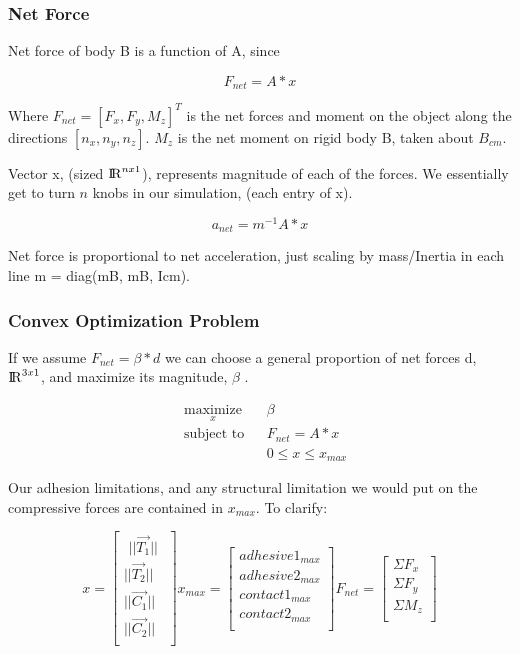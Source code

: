 \documentclass{beamer}
\begin{document}
\frame
{
\frametitle{ Net Force }


Net force of body B is a function of A, since 

\begin{equation}
	F_{net} = A * x
\end{equation}


Where $F_{net} = [F_{x}, F_{y},  M_{z}]^{T}$ is the net forces and moment on the object along the directions $[n_{x}, n_{y}, n_{z}]$.  $M_z$ is the net moment on rigid body B, taken about $B_{cm}$.

Vector x, (sized ${\rm I\!R} ^{n x 1}$), represents magnitude of each of the forces. We essentially get to turn $n$ knobs in our simulation, (each entry of x). 

\begin{equation}
	a_{net} = m^{-1}A * x
\end{equation}

Net force is proportional to net acceleration, just scaling by mass/Inertia in each line m = diag(mB, mB, Icm). 
	
}


\frame
{
\frametitle{ Convex Optimization Problem }

If we assume $ F_{net} = \beta*d $ we can choose a general proportion of net forces d, ${\rm I\!R} ^{3 x 1}$,  and maximize its magnitude, $\beta$ .
	
\begin{equation*}
	\begin{aligned}
	& \underset{x}{\text{maximize}}
	& & \beta \\
	& \text{subject to}
	& & F_{net} = A * x \\
	&
	& & 0 \leq x \leq x_{max}
	\end{aligned}
\end{equation*}

Our adhesion limitations, and any structural limitation we would put on the compressive forces are contained in $x_{max}$. To clarify:  

\begin{equation*}
x = 
\begin{bmatrix}
           \,\, ||\vec{T_{1}}|| \,\,\\
           ||\vec{T_{2}}|| \\
           ||\vec{C_{1}}|| \\
           ||\vec{C_{2}}|| \\
\end{bmatrix} 
x_{max} = 
\begin{bmatrix}
           adhesive1_{max} \\
           adhesive2_{max} \\
           contact1_{max} \\
           contact2_{max} \\ 
\end{bmatrix} 
F_{net} = 
\begin{bmatrix}
           \Sigma F_{x} \\
           \Sigma F_{y}\\
           \Sigma M_{z}\\
\end{bmatrix} 
\end{equation*}	
}
\end{document}
